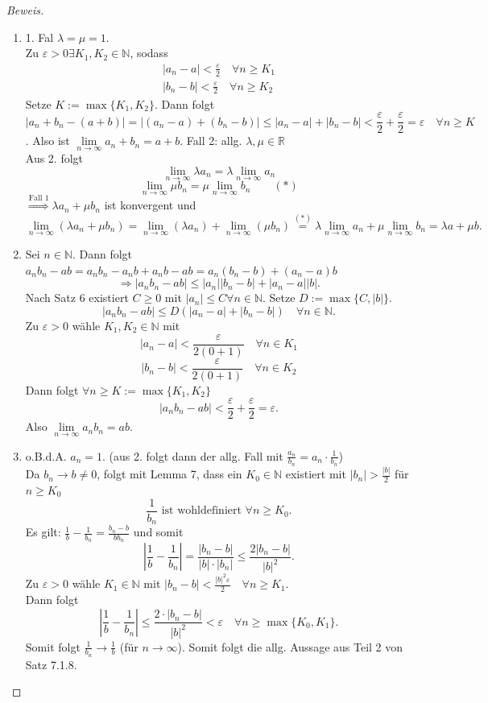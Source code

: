 \documentclass[12pt,a4paper,titlepage]{article} %
\theoremstyle{definition}
\theoremstyle{remark}
\newenvironment{bew}{\begin{proof}[Beweis]}{\end{proof}}
\newcommand{\N}{\mathbb{N}}
\newcommand{\R}{\mathbb{R}}
\begin{document}
\begin{bew}
	\begin{enumerate}
		\item 1. Fal $\lambda = \mu = 1$.\\
		Zu $\varepsilon>0 \exists K_1, K_2 \in\N$, sodass
		\begin{align*}
			|a_n-a|<\frac{\varepsilon}{2} \quad \forall n\geq K_1\\
			|b_n-b|<\frac{\varepsilon}{2} \quad \forall n\geq K_2
		\end{align*}
		Setze $K := \max \{K_1, K_2\}$. Dann folgt 
		$$|a_n + b_n - (a+b)| = |(a_n-a)+(b_n-b)| \leq |a_n-a|+|b_n-b| < \frac{\varepsilon}{2} + \frac{\varepsilon}{2} = \varepsilon \quad \forall n\geq K$$.
		Also ist $\lim\limits_{n\rightarrow\infty}a_n+b_n=a+b$.
		Fall 2: allg. $\lambda,\mu\in\R$\\
		Aus 2. folgt 
		$$\lim\limits_{n\rightarrow\infty} \lambda a_n = \lambda \lim\limits_{n\rightarrow\infty} a_n$$
		$$\lim\limits_{n\rightarrow\infty} \mu b_n = \mu \lim\limits_{n\rightarrow\infty} b_n \qquad(*)$$
		$\overset{\text{Fall 1}}{\Rightarrow} \lambda a_n + \mu b_n$ ist konvergent und $$\lim\limits_{n\rightarrow\infty} (\lambda a_n + \mu b_n) = \lim\limits_{n\rightarrow\infty} (\lambda a_n) + \lim\limits_{n\rightarrow\infty} (\mu b_n) \overset{(*)}{=} \lambda \lim\limits_{n\rightarrow\infty} a_n + \mu \lim\limits_{n\rightarrow\infty} b_n = \lambda a + \mu b.$$
		\item Sei $n\in\N$. Dann folgt $a_nb_n-ab = a_nb_n -a_nb + a_n b - ab=a_n(b_n-b)+(a_n-a)b$
		$$\Rightarrow |a_nb_n -ab|\leq |a_n| |b_n-b| + |a_n-a||b|.$$
		Nach Satz 6 existiert $C\geq 0$ mit $|a_n|\leq C \forall n\in\N$. Setze $D:= \max \{C, |b|\}$. 
		$$|a_nb_n-ab| \leq D(|a_n-a|+|b_n-b|) \quad \forall n\in\N.$$
		Zu $\varepsilon > 0$ wähle $K_1,K_2\in\N$ mit $$|a_n-a|<\frac{\varepsilon}{2(0+1)} \quad \forall n\in K_1$$
		$$|b_n-b|<\frac{\varepsilon}{2(0+1)} \quad \forall n\in K_2$$
		Dann folgt $\forall n\geq K := \max \{K_1, K_2\}$
		$$|a_nb_n -ab|<\frac{\varepsilon}{2} + \frac{\varepsilon}{2} = \varepsilon.$$
		Also $\lim\limits_{n\rightarrow\infty} a_nb_n = ab$.
		\item o.B.d.A. \(a_n = 1\). (aus 2. folgt dann der allg. Fall mit \( \frac{a_n}{b_n} = a_n \cdot\frac{1}{b_n} \))\\
		Da \(b_n \rightarrow b \neq 0\), folgt mit Lemma 7, dass ein \(K_0\in\N\) existiert mit \(|b_n| >\frac{|b|}{2} \) für \(n\geq K_0\) 
		\[\frac{1}{b_n} \text{ ist wohldefiniert } \forall n\geq K_0.\]
		Es gilt: \( \frac{1}{b} - \frac{1}{b_n} = \frac{b_n - b}{b b_n} \) und somit 
		\[ \left| \frac{1}{b} - \frac{1}{b_n} \right| = \frac{|b_n-b|}{|b| \cdot |b_n|} \leq \frac{2 |b_n - b|}{|b|^2}. \]
		Zu \(\varepsilon >0 \) wähle \(K_1 \in \N \) mit \(|b_n - b| < \frac{|b|^2\varepsilon}{2} \quad \forall n\geq K_1 \).\\
		Dann folgt 
		\[ \left| \frac{1}{b} - \frac{1}{b_n} \right| \leq \frac{2 \cdot |b_n - b|}{|b|^2} < \varepsilon \quad \forall n\geq\max \{ K_0,K_1\}. \]
		Somit folgt \( \frac{1}{b_n} \rightarrow \frac{1}{b} \) (für \(n\rightarrow \infty \)). Somit folgt die allg. Aussage aus Teil 2 von Satz 7.1.8.
	\end{enumerate}
\end{bew}
\end{document}

